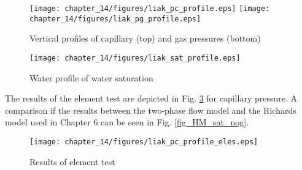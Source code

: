 \begin{figure}[htb!]
\begin{center}
\texttt{[image: chapter\_14/figures/liak\_pc\_profile.eps]}
\texttt{[image: chapter\_14/figures/liak\_pg\_profile.eps]}
\end{center}
\caption{Vertical profiles of capillary (top) and gas pressures (bottom)}
\label{liak:p_pc}
\end{figure}

\begin{figure}[htb!]
\begin{center}
\texttt{[image: chapter\_14/figures/liak\_sat\_profile.eps]}
\end{center}
\caption{Water profile of water saturation}
\label{liak:p_sat}
\end{figure}

The results of the element test are depicted in Fig. \ref{liak:p_pce} for capillary pressure. A comparison if the results between the two-phase flow model and the Richards model used in Chapter 6 can be seen in Fig. \ref{fig_HM_sat_nog}. 

\begin{figure}[htb!]
\begin{center}
\texttt{[image: chapter\_14/figures/liak\_pc\_profile\_eles.eps]}
\end{center}
\caption{Results of element test}
\label{liak:p_pce}
\end{figure}

